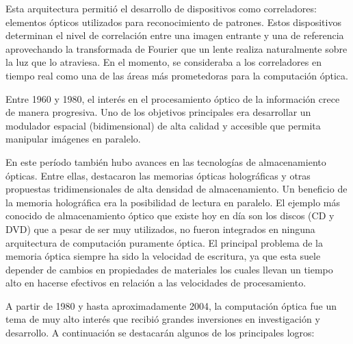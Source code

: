 \documentclass[12pt,a4paper]{report}
\begin{document}
Esta arquitectura permitió el desarrollo de dispositivos como correladores: elementos ópticos utilizados para reconocimiento de patrones. Estos dispositivos determinan el nivel de correlación entre una imagen entrante y una de referencia aprovechando la transformada de Fourier que un lente realiza naturalmente sobre la luz que lo atraviesa. En el momento, se consideraba a los correladores en tiempo real como una de las áreas más prometedoras para la computación óptica.

Entre 1960 y 1980, el interés en el procesamiento óptico de la información crece de manera progresiva. Uno de los objetivos principales era desarrollar un modulador espacial (bidimensional) de alta calidad y accesible que permita manipular imágenes en paralelo. 

En este período también hubo avances en las tecnologías de almacenamiento ópticas. Entre ellas, destacaron las memorias ópticas holográficas y otras propuestas tridimensionales de alta densidad de almacenamiento. Un beneficio de la memoria holográfica era la posibilidad de lectura en paralelo. El ejemplo más conocido de almacenamiento óptico que existe hoy en día son los discos (CD y DVD) que a pesar de ser muy utilizados, no fueron integrados en ninguna arquitectura de computación puramente óptica. El principal problema de la memoria óptica siempre ha sido la velocidad de escritura, ya que esta suele depender de cambios en propiedades de materiales los cuales llevan un tiempo alto en hacerse efectivos en relación a las velocidades de procesamiento.

A partir de 1980 y hasta aproximadamente 2004, la computación óptica fue un tema de muy alto interés que recibió grandes inversiones en investigación y desarrollo. A continuación se destacarán algunos de los principales logros:
\end{document}
